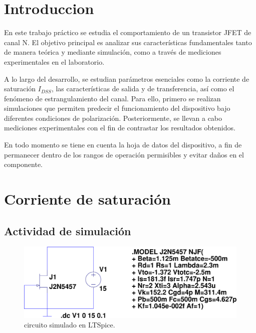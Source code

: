 \documentclass[chaptersright]{informeutn}
\begin{document}
\maketitle
\tableofcontents

\chapter{Introduccion}
En este trabajo práctico se estudia el comportamiento de un transistor JFET de canal N. El objetivo 
principal es analizar sus características fundamentales tanto de manera teórica y mediante 
simulación, como a través de mediciones experimentales en el laboratorio.

A lo largo del desarrollo, se estudian parámetros esenciales como la corriente de saturación 
$I_{DSS}$, las características de salida y de transferencia, así como el fenómeno de estrangulamiento 
del canal. Para ello, primero se realizan simulaciones que permiten predecir el funcionamiento del 
dispositivo bajo diferentes condiciones de polarización. Posteriormente, se llevan a cabo mediciones 
experimentales con el fin de contrastar los resultados obtenidos.

En todo momento se tiene en cuenta la hoja de datos del dispositivo, a fin de permanecer dentro de 
los rangos de operación permisibles y evitar daños en el componente.


\chapter{Corriente de saturación}

    \section{Actividad de simulación}
    \begin{figure}[ht!]
        \centering
        \includegraphics[width=0.8\linewidth]{pictures/saturacion.png}
        \caption{circuito simulado en LTSpice.}
        \label{fig:sim-saturacion}
    \end{figure}
    
\end{document}
